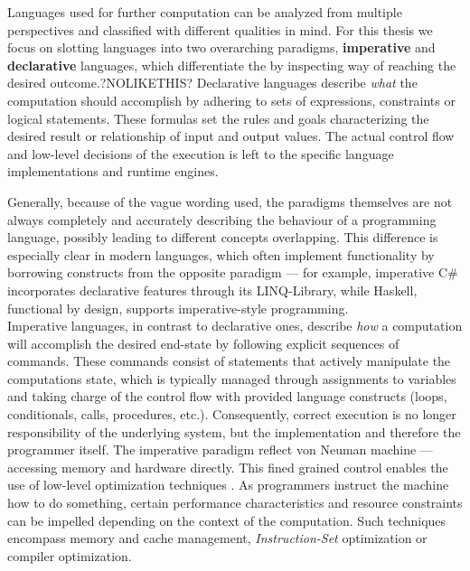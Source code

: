 \documentclass[11pt]{report}
\begin{document}
Languages used for further computation can be analyzed from multiple perspectives and classified with different qualities in mind. \cite{progParadigmsForDummiess}
For this thesis we focus on slotting languages into two overarching paradigms, \textbf{imperative} and \textbf{declarative} languages, 
which differentiate the  by inspecting way of reaching the desired outcome.?NOLIKETHIS?
Declarative languages describe \textit{what} the computation should accomplish by adhering to sets of expressions, constraints or logical statements. \cite{grammarDrivenDSLDebug}
These formulas set the rules and goals characterizing the desired result or relationship of input and output values. The actual control flow and low-level decisions of
the execution is left to the specific language implementations and runtime engines.

Generally, because of the vague wording used, the paradigms themselves are not always completely and accurately describing the behaviour of a programming language,
possibly leading to different concepts overlapping. This difference is especially clear in modern languages, which often implement functionality by borrowing 
constructs from the opposite paradigm — for example, imperative C\# incorporates declarative features through its LINQ-Library, while Haskell, functional by 
design, supports imperative-style programming. \cite{netHaskellClaims}\\

Imperative languages, in contrast to declarative ones, describe \textit{how} a computation will accomplish the desired end-state by following explicit sequences
of commands. These commands consist of statements that actively manipulate the computations state, which is typically managed through assignments to variables 
and taking charge of the control flow with provided language constructs (loops, conditionals, calls, procedures, etc.).
Consequently, correct execution is no longer responsibility of the underlying system, but the implementation and therefore the programmer itself. The imperative paradigm
reflect von Neuman machine — accessing memory and hardware directly. This fined grained control enables the use of low-level optimization techniques \cite{lowLvelOpt}. 
As programmers instruct the machine how to do something, certain performance characteristics and resource constraints can be impelled depending on the context of the computation.
Such techniques encompass memory and cache management, \textit{Instruction-Set} optimization or compiler optimization.
\end{document}

